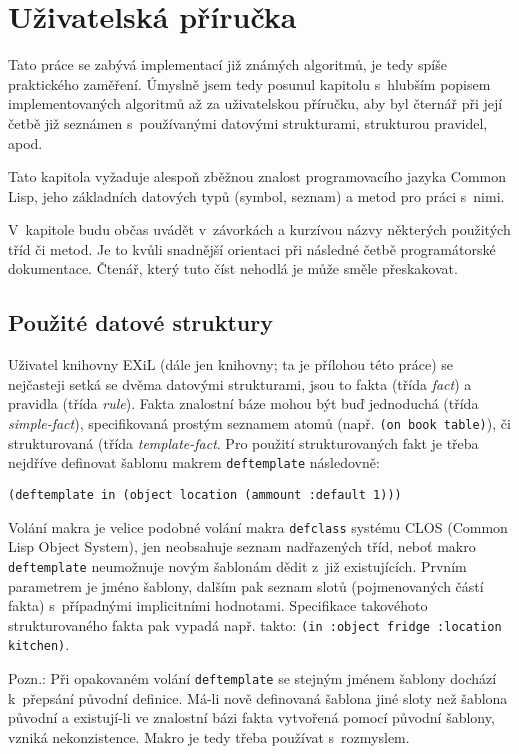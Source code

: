 \section{Uživatelská příručka}
Tato práce se zabývá implementací již známých algoritmů, je tedy spíše
praktického zaměření. Úmyslně jsem tedy posunul kapitolu s~hlubším popisem
implementovaných algoritmů až za uživatelskou příručku, aby byl čternář při
její četbě již seznámen s~používanými datovými strukturami, strukturou
pravidel, apod.

Tato kapitola vyžaduje alespoň zběžnou znalost programovacího jazyka
Common Lisp, jeho základních datových typů (symbol, seznam) a metod pro
práci s~nimi.

V~kapitole budu občas uvádět v~závorkách a kurzívou názvy některých použitých
tříd či metod. Je to kvůli snadnější orientaci při následné četbě programátorské
dokumentace. Čtenář, který tuto číst nehodlá je může směle přeskakovat.
\subsection{Použité datové struktury}
Uživatel knihovny \textsf{EXiL} (dále jen knihovny; ta je přílohou této práce)
se nejčasteji setká se dvěma datovými strukturami, jsou to fakta (třída
\emph{fact}) a pravidla (třída \emph{rule}). Fakta znalostní báze mohou být buď
jednoduchá (třída \emph{simple-fact}), specifikovaná prostým seznamem atomů (např.
\verb|(on book table)|), či strukturovaná (třída \emph{template-fact}. Pro
použití strukturovaných fakt je třeba nejdříve definovat šablonu makrem
\verb|deftemplate| následovně:
\begin{verbatim}
(deftemplate in (object location (ammount :default 1)))
\end{verbatim}
Volání makra je velice podobné volání makra \verb|defclass| systému \textsf{CLOS}
(Common Lisp Object System), jen neobsahuje seznam nadřazených tříd, neboť makro
\verb|deftemplate| neumožnuje novým šablonám dědit z~již existujících.
Prvním parametrem je jméno šablony, dalším pak seznam slotů (pojmenovaných
částí fakta) s~případnými implicitními hodnotami. Specifikace takovéhoto
strukturovaného fakta pak vypadá např. takto:
\verb|(in :object fridge :location kitchen)|.

Pozn.: Při opakovaném volání \verb|deftemplate| se stejným jménem šablony
dochází k~přepsání původní definice. Má-li nově definovaná šablona jiné sloty
než šablona původní a existují-li ve znalostní bázi fakta vytvořená pomocí
původní šablony, vzniká nekonzistence. Makro je tedy třeba používat s~rozmyslem.

